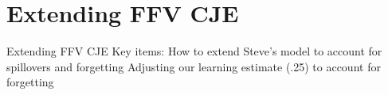 \documentclass{beamer}
\begin{document}
\section{Extending FFV CJE}
\begin{frame}{Extending FFV CJE}
Key items:
\newline
\newline
How to extend Steve's model to account for spillovers and forgetting
\newline
\newline
Adjusting our learning estimate (.25) to account for forgetting
\end{frame}

\end{document}
